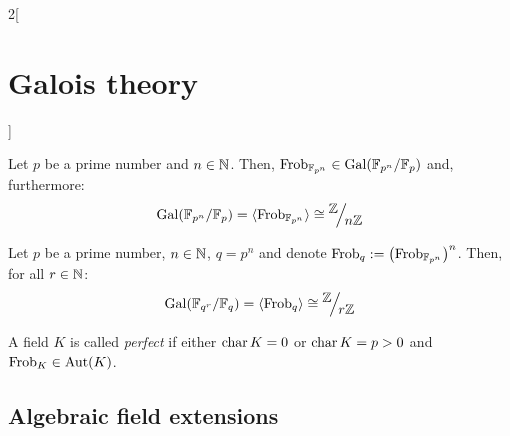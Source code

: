 \documentclass[../../../main.tex]{subfiles}
\begin{document}
\begin{multicols}{2}[\section{Galois theory}]
\begin{definition}
  \end{definition}
  \begin{theorem}
    Let $p$ be a prime number and $n\in\mathbb{N}$. Then, $\text{Frob}_{\FF_{p^n}}\in\Gal(\quot{\FF_{p^n}}{\FF_p})$ and, furthermore: $$\Gal(\FF_{p^n}/\FF_p)=\langle\text{Frob}_{\FF_{p^n}}\rangle\cong\quot{\ZZ}{n\ZZ}$$
  \end{theorem}
  \begin{corollary}
    Let $p$ be a prime number, $n\in\mathbb{N}$, $q=p^n$ and denote $\text{Frob}_q:={\left(\text{Frob}_{\mathbb{F}_{p^n}}\right)}^n$. Then, for all $r\in\mathbb{N}$: $$\Gal(\FF_{q^r}/\FF_q)=\langle\text{Frob}_q\rangle\cong\quot{\ZZ}{r\ZZ}$$
  \end{corollary}
  \begin{definition}
    A field $K$ is called \textit{perfect} if either $\operatorname{char} K=0$ or $\operatorname{char} K=p>0$ and $\text{Frob}_K\in\operatorname{Aut}(K)$.
  \end{definition}
  \subsection{Algebraic field extensions}

\end{multicols}
\end{document}
